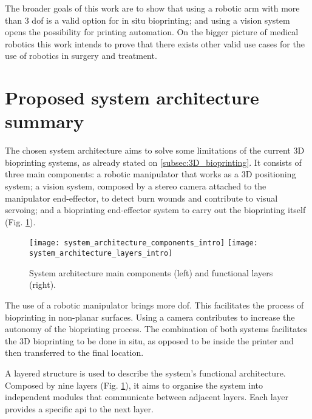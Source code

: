 The broader goals of this work are to show that using a robotic arm with more than 3 \gls{dof} is a valid option for in situ bioprinting; and using a vision system opens the possibility for printing automation. On the bigger picture of medical robotics this work intends to prove that there exists other valid use cases for the use of robotics in surgery and treatment.


\section{Proposed system architecture summary} %
\label{sec:proposed_system_architecture_summary}

The chosen system architecture aims to solve some limitations of the current 3D bioprinting systems, as already stated on \ref{subsec:3D_bioprinting}. It consists of three main components: a robotic manipulator that works as a 3D positioning system; a vision system, composed by a stereo camera attached to the manipulator end-effector, to detect burn wounds and contribute to visual servoing; and a bioprinting end-effector system to carry out the bioprinting itself (Fig. \ref{fig:system_architecture_intro}).

\begin{figure}[htbp]
	\centering
	\texttt{[image: system\_architecture\_components\_intro]}
	\hspace{0.1in}
	\texttt{[image: system\_architecture\_layers\_intro]}
	\caption{System architecture main components (left) and functional layers (right).}
	\label{fig:system_architecture_intro}
\end{figure}

The use of a robotic manipulator brings more \gls{dof}. This facilitates the process of bioprinting in non-planar surfaces. Using a camera contributes to increase the autonomy of the bioprinting process. The combination of both systems facilitates the 3D bioprinting to be done in situ, as opposed to be inside the printer and then transferred to the final location.

A layered structure is used to describe the system's functional architecture. Composed by nine layers (Fig. \ref{fig:system_architecture_intro}), it aims to organise the system into independent modules that communicate between adjacent layers. Each layer provides a specific \gls{api} to the next layer.

